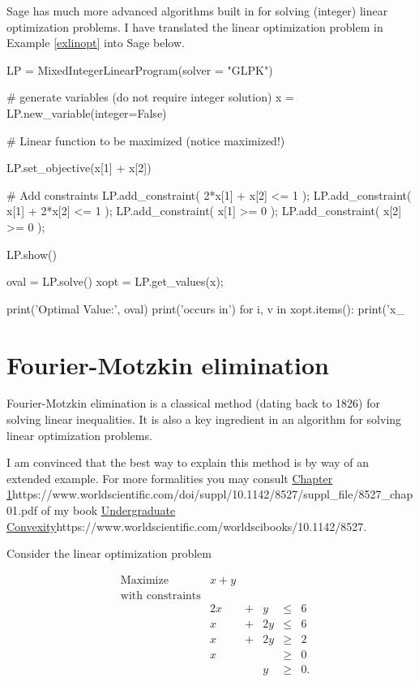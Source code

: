 \documentclass{article}
\begin{document}
  Sage has much more advanced algorithms built in for solving (integer) linear optimization
  problems. I have translated the linear optimization problem in Example \ref{exlinopt} into
  Sage below.

\begin{sage}
LP = MixedIntegerLinearProgram(solver = "GLPK")
 
# generate variables (do not require integer solution) 
x = LP.new_variable(integer=False)
 
# Linear function to be maximized (notice maximized!)

LP.set_objective(x[1] + x[2])
    
# Add constraints
LP.add_constraint( 2*x[1] + x[2] <= 1 );
LP.add_constraint( x[1] + 2*x[2] <= 1 );
LP.add_constraint( x[1] >= 0 );
LP.add_constraint( x[2] >= 0 );

 
LP.show()
 
oval = LP.solve()
xopt = LP.get_values(x);
 
print('Optimal Value:', oval)
print('occurs in')
for i, v in xopt.items():
    print('x_%
\end{sage}
  
\section{Fourier-Motzkin elimination}

Fourier-Motzkin elimination is a classical method (dating back to 1826) for solving linear inequalities. 
It is also a key ingredient in an algorithm for solving linear optimization problems.

I am convinced that
the best way to explain this method is by way of an extended example. For more formalities you may
consult \url{Chapter 1}{https://www.worldscientific.com/doi/suppl/10.1142/8527/suppl_file/8527_chap01.pdf} of my book \url{Undergraduate Convexity}{https://www.worldscientific.com/worldscibooks/10.1142/8527}.

Consider the linear optimization problem

\begin{equation}\label{optfmex}
  \begin{array}{llrrrr}
    &\text{Maximize} &x + y\\
    &\text{with constraints}\\
    &&2 x &+ &y &\leq &6\\
    &&x &+ &2 y &\leq &6\\
    &&x &+ &2 y &\geq &2\\
    &&x && &\geq &0\\
    &&&&y &\geq &0.
  \end{array}
\end{equation}
  
\end{document}
